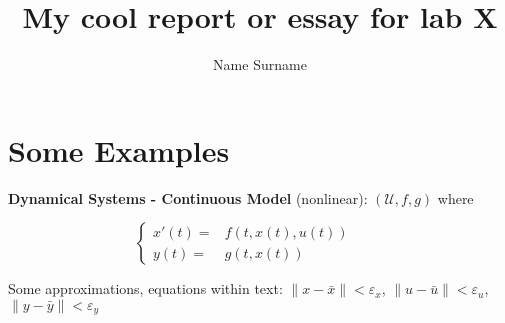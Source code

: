 \documentclass[12pt,a4paper]{article}
\title{My cool report or essay for lab X}
\author{Name Surname}
\numberwithin{equation}{section}  %
\begin{document}
 
 
 \maketitle
 \newpage
 \tableofcontents
  \newpage
 \section{Some Examples}
 
 {\bf Dynamical Systems - Continuous Model} (nonlinear): $(\mathcal{U}, f, g)$ where

\begin{equation}
\label{eq:SDN}
\left\{ \begin{aligned}
        x'(t) = & f(t, x(t), u(t)) \ \\
        y(t) = & g(t, x(t)) \ 
       \end{aligned}
 \right.
 \qquad 
\end{equation}

Some approximations, equations within text: $\| x - \bar{x}\| < \varepsilon_x$, $\| u - \bar{u}\| < \varepsilon_u$, $\| y - \bar{y}\| < \varepsilon_y$
 
\end{document}
